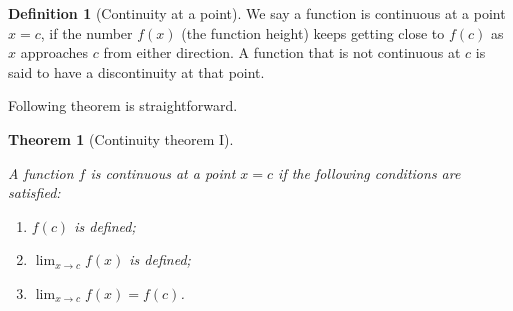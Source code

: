 \documentclass[
]{book}
\newtheorem{theorem}{Theorem}[chapter]
\theoremstyle{definition}
\newtheorem{definition}{Definition}[chapter]
\theoremstyle{definition}
\theoremstyle{definition}
\theoremstyle{definition}
\theoremstyle{remark}
\begin{document}
\begin{definition}[Continuity at a point]
\protect\hypertarget{def:unnamed-chunk-17}{}\label{def:unnamed-chunk-17}We say a function is continuous at a point \(x = c\), if the number \(f(x)\) (the function height) keeps getting close to \(f(c)\) as \(x\) approaches \(c\) from either direction. A function that is not continuous at \(c\) is said to have a discontinuity at that point.
\end{definition}

Following theorem is straightforward.

\begin{theorem}[Continuity theorem I]
\protect\hypertarget{thm:unnamed-chunk-18}{}\label{thm:unnamed-chunk-18}

A function \(f\) is continuous
at a point \(x = c\) if the following conditions are satisfied:

\begin{enumerate}
\def\labelenumi{\arabic{enumi}.}
\item
  \(f(c)\) is defined;
\item
  \(\lim_{{x \to c}} f(x)\) is defined;
\item
  \(\lim_{{x \to c}} f(x) = f(c)\).
\end{enumerate}

\end{theorem}
\end{document}
